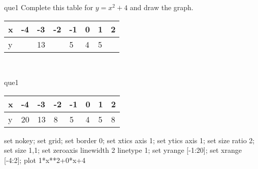 \documentclass[13.5pt, varwidth=true]{beamer}
\begin{document}
\begin{frame}[shrink=19,fragile]
	\begin{beamercolorbox}[rounded=true, left, shadow=true,wd=14.8cm]{que1}
		 Complete this table for $y = x^{2} + 4$ and draw the graph. \\[0.3cm] \renewcommand{\arraystretch}{1.2}\begin{tabular}{|C|C|C|C|C|C|C|C|} \hline x & -4 & -3 & -2 & -1 & 0 & 1 & 2 \\ \hline y &  & 13 &  & 5 & 4 & 5 & \\ \hline \end{tabular}\\[0.3cm]
	\end{beamercolorbox}
\end{frame}
\begin{frame}[shrink=19,fragile]
	\begin{beamercolorbox}[rounded=true, left, shadow=true,wd=14.8cm]{que1}
		\renewcommand{\arraystretch}{1.2}\begin{tabular}{|C|C|C|C|C|C|C|C|} \hline x & -4 & -3 & -2 & -1 & 0 & 1 & 2 \\ \hline y & 20 & 13 & 8 & 5 & 4 & 5 & 8\\ \hline \end{tabular}\begin{gnuplot}[terminal=pdf] set nokey; set grid; set border 0; set xtics axis 1; set ytics axis 1; set size ratio 2; set size 1,1; set zeroaxis linewidth 2 linetype 1; set yrange [-1:20]; set xrange [-4:2]; plot 1*x**2+0*x+4 \end{gnuplot}
	\end{beamercolorbox}
\end{frame}
\end{document}
